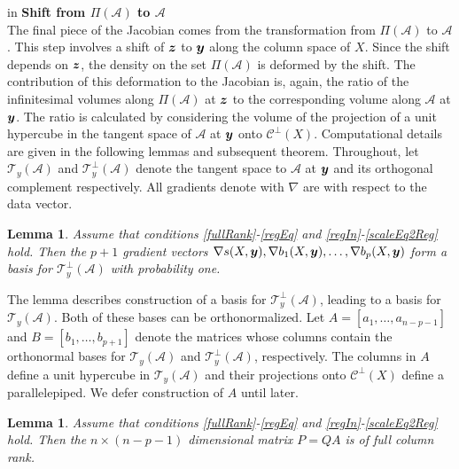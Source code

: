 \documentclass[ba]{imsart}
\newcommand{\by}{\mbox{\boldmath $y$}}
\newcommand{\bz}{\mbox{\boldmath $z$}}
\newcommand{\mc}{\mathcal}
\newtheorem{lemma}[theorem]{\bf Lemma}
\begin{document}
 in
\noindent
{\bf Shift from $\Pi(\mathcal{A})$ to $\mathcal{A}$} \\
The final piece of the Jacobian comes from the transformation from
$\Pi(\mathcal{A})$ to $\mathcal{A}$.  %
This step involves a shift of
$\bz$ to $\by$ along the column space of $X$. Since the shift depends on 
$\bz$, the density on the set 
$\Pi(\mathcal{A})$ is deformed by the shift. The
contribution of this deformation to the Jacobian is, again,
the ratio of the infinitesimal volumes along $\Pi(\mathcal{A})$ at $\bz$ to the
corresponding volume along $\mathcal{A}$ at $\by$. 
The ratio is calculated by considering the volume of the
projection of a unit hypercube in the tangent space of $\mathcal{A}$
at $\by$ onto $\mc{C}^\perp(X)$.
Computational details are
given in the following lemmas and subsequent theorem. Throughout, let
$\mc T_{y}(\mc A)$ and $\mc T_{y}^{\perp}(\mc A)$ denote the tangent
space to $\mc A$ at $\by$ and its orthogonal complement respectively. All gradients denote with $\nabla$ are with respect to the data vector.
\begin{lemma}
\label{lem:basis}
Assume that conditions \ref{fullRank}-\ref{regEq} and \ref{regIn}-\ref{scaleEq2Reg} hold.  Then the $p+1$ gradient vectors 
$\nabla s(X,\by), \nabla b_1(X,\by),\dots, \nabla b_p(X,\by)$ form a
basis for $\mc T_{y}^\perp(\mc A)$ with probability one.
\end{lemma}

The lemma describes construction of a basis for $\mc T_{y}^\perp(\mc A)$, leading to a 
basis for $\mc T_{y}(\mc A)$.  Both of these bases can be orthonormalized.  
Let $A=[a_{1},\dots,a_{n-p-1}]$  and $B=[b_1,\dots,b_{p+1}]$ denote the 
matrices whose columns contain the orthonormal bases for  $\mc T_{y}(\mc A)$ and  $\mc T^{\perp}_{y}(\mc A)$, respectively.  
The columns in $A$ define a unit hypercube in $\mc T_{y}(\mc
  A)$ and their projections onto $\mc{C}^\perp(X)$ define a parallelepiped.
We defer construction of $A$ until later. 

\begin{lemma}
\label{lem:fullrank}
Assume that conditions \ref{fullRank}-\ref{regEq} and \ref{regIn}-\ref{scaleEq2Reg} hold.  
Then the $n\times (n-p-1)$ dimensional matrix $P=QA$ is of full column rank.
\end{lemma}
\end{document}
